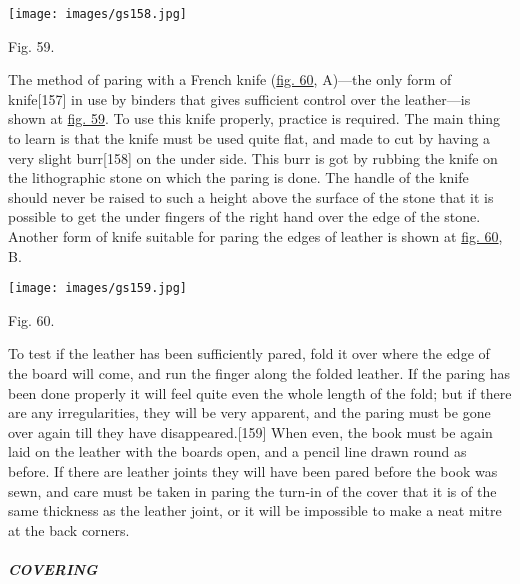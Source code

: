 \documentclass[
]{article}
\begin{document}
\protect\hypertarget{Fig_59}{}{}
\texttt{[image: images/gs158.jpg]}

Fig. 59.

The method of paring with a French knife
(\protect\hyperlink{Fig_60}{fig. 60}, A)---the only form of
knife{\protect\hypertarget{Page_157}{}{{[}157{]}}} in use by binders
that gives sufficient control over the leather---is shown at
\protect\hyperlink{Fig_59}{fig. 59}. To use this knife properly,
practice is required. The main thing to learn is that the knife must be
used quite flat, and made to cut by having a very slight
burr{\protect\hypertarget{Page_158}{}{{[}158{]}}} on the under side.
This burr is got by rubbing the knife on the lithographic stone on which
the paring is done. The handle of the knife should never be raised to
such a height above the surface of the stone that it is possible to get
the under fingers of the right hand over the edge of the stone. Another
form of knife suitable for paring the edges of leather is shown at
\protect\hyperlink{Fig_60}{fig. 60}, B.

\protect\hypertarget{Fig_60}{}{}
\texttt{[image: images/gs159.jpg]}

Fig. 60.

To test if the leather has been sufficiently pared, fold it over where
the edge of the board will come, and run the finger along the folded
leather. If the paring has been done properly it will feel quite even
the whole length of the fold; but if there are any irregularities, they
will be very apparent, and the paring must be gone over again till they
have disappeared.{\protect\hypertarget{Page_159}{}{{[}159{]}}} When
even, the book must be again laid on the leather with the boards open,
and a pencil line drawn round as before. If there are leather joints
they will have been pared before the book was sewn, and care must be
taken in paring the turn-in of the cover that it is of the same
thickness as the leather joint, or it will be impossible to make a neat
mitre at the back corners.

\hypertarget{covering}{%
\subparagraph{COVERING}\label{covering}}
\end{document}
